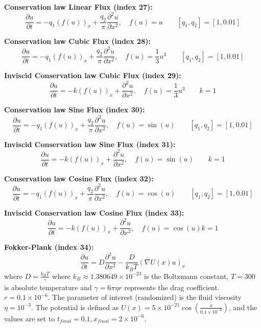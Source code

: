 \textbf{Conservation law Linear Flux (index 27):} 
\[
\frac{\partial u}{\partial t} = -q_1 \left( f(u) \right)_x + \frac{q_2}{\pi} \frac{\partial^2 u}{\partial x^2}, \quad f(u) = u \qquad [q_1,q_2] = [1,0.01]
\]

\textbf{Conservation law Cubic Flux (index 28):} 
\[
\frac{\partial u}{\partial t} = -q_1 \left( f(u) \right)_x + \frac{q_2}{\pi} \frac{\partial^2 u}{\partial x^2}, \quad f(u) = \frac{1}{3} u^3 \qquad [q_1,q_2] = [1,0.01]
\]

\textbf{Inviscid Conservation law Cubic Flux (index 29):} 
\[
\frac{\partial u}{\partial t} = -k \left( f(u) \right)_x + \frac{\partial^2 u}{\partial x^2}, \quad f(u) = \frac{1}{3} u^3 \qquad k =1
\]

\textbf{Conservation law Sine Flux (index 30):} 
\[
\frac{\partial u}{\partial t} = -q_1 \left( f(u) \right)_x + \frac{q_2}{\pi} \frac{\partial^2 u}{\partial x^2}, \quad f(u) = \sin(u) \qquad [q_1,q_2] = [1,0.01]
\]

\textbf{Inviscid Conservation law Sine Flux (index 31):} 
\[
\frac{\partial u}{\partial t} = -k \left( f(u) \right)_x + \frac{\partial^2 u}{\partial x^2}, \quad f(u) = \sin(u) \qquad k = 1
\]

\textbf{Conservation law Cosine Flux (index 32):} 
\[
\frac{\partial u}{\partial t} = -q_1 \left( f(u) \right)_x + \frac{q_2}{\pi} \frac{\partial^2 u}{\partial x^2}, \quad f(u) = \cos(u) \qquad [q_1,q_2] = [1,0.01]
\]

\textbf{Inviscid Conservation law Cosine Flux (index 33):} 
\[
\frac{\partial u}{\partial t} = -k \left( f(u) \right)_x + \frac{\partial^2 u}{\partial x^2}, \quad f(u) = \cos(u) k = 1
\]

\textbf{Fokker-Plank (index 34):} 
\[
\frac{\partial u}{\partial t} = D \frac{\partial^2 u}{\partial x^2} - \frac{D}{k_BT} \left( \nabla U(x)u \right)_x
\]
where $D = \frac{k_BT}{\gamma}$ where $k_B \approx 1.380649\times 10^{-23}$ is the Boltzmann constant, $T=300$ is absolute temperature and $\gamma = 6\pi\eta r$ represents the drag coefficient. $r = 0.1\times 10^{-6}$. The parameter of interest (randomized) is the fluid viscosity $\eta = 10^{-3}$. The potential is defined as $U(x) = 5\times 10^{-21} \cos\left(\frac{x}{0.1\times 10^{-6}}\right)$, and the values are set to $t_{final} = 0.1, x_{final}= 2\times 10^{-6}$.

